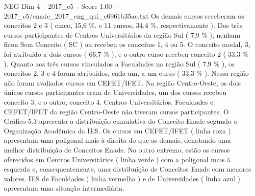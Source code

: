 \begin{textsample}{NEG Dim 4 – 2017\_c5 – Score 1.00 – 2017\_c5/enade\_2017\_eng\_qui\_c6961b35ac.txt}
Os demais cursos receberam os conceitos 2 e 3 ( cinco, 15,6 \%, e 11 cursos, 34,4 \%, respectivamente ).
Dos três cursos participantes de Centros Universitários da região Sul ( 7,9 \% ), nenhum ficou Sem Conceito ( SC ) ou recebeu os conceitos 1, 4 ou 5.
O conceito modal, 3, foi atribuído a dois cursos ( 66,7 \% ), e o outro curso recebeu conceito 2 ( 33,3 \% ).
Quanto aos três cursos vinculados a Faculdades na região Sul ( 7,9 \% ), os conceitos 2, 3 e 4 foram atribuídos, cada um, a um curso ( 33,3 \% ).
Nessa região não foram avaliados cursos em CEFET/IFET.
Na região Centro-Oeste, os dois únicos cursos participantes eram de Universidades, um dos cursos recebeu conceito 3, e o outro, conceito 4.
Centros Universitários, Faculdades e CEFET/IFET da região Centro-Oeste não tiveram cursos participantes.
O Gráfico 5.3 apresenta a distribuição cumulativa do Conceito Enade segundo a Organização Acadêmica da IES.
Os cursos em CEFET/IFET ( linha roxa ) apresentam uma poligonal mais à direita do que as demais, denotando uma melhor distribuição de Conceitos Enade.
No outro extremo, estão os cursos oferecidos em Centros Universitários ( linha verde ) com a poligonal mais à esquerda e, consequentemente, uma distribuição de Conceitos Enade com menores valores.
IES de Faculdades ( linha vermelha ) e de Universidades ( linha azul ) apresentam uma situação intermediária.

\end{textsample}
